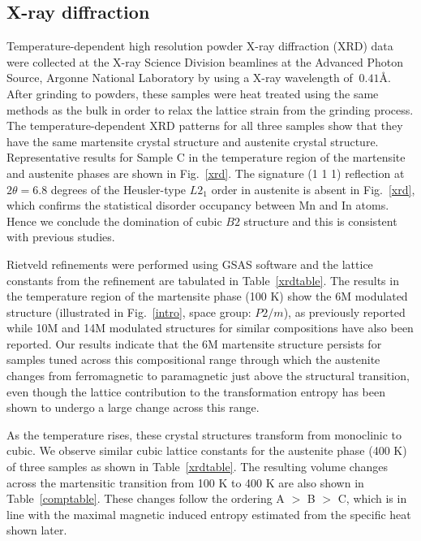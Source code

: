 \documentclass[sort&compress,twocolumn,3p]{elsarticle}
\begin{document}
\subsection{X-ray diffraction}
Temperature-dependent high resolution powder X-ray diffraction (XRD) data were collected at the X-ray Science Division beamlines at the Advanced Photon Source, Argonne National Laboratory by using a X-ray wavelength of $~0.41$\AA.
After grinding to powders, these samples were heat treated using the same methods as the bulk in order to relax the lattice strain from the grinding process.
The temperature-dependent XRD patterns for all three samples show that they have the same martensite crystal structure and austenite crystal structure.
Representative results for Sample C in the temperature region of the martensite and austenite phases are shown in Fig.~\ref{xrd}.
The signature (1 1 1) reflection at $2\theta=6.8$ degrees of the Heusler-type $L2_1$ order in austenite is absent in Fig.~\ref{xrd},
	which confirms the statistical disorder occupancy between Mn and In atoms.
Hence we conclude the domination of cubic $B2$ structure and this is consistent with previous studies\cite{Recarte20121937,Bruno2017}.

Rietveld refinements were performed using GSAS software\cite{larson94,toby01} and the lattice constants from the refinement are tabulated in Table~\ref{xrdtable}.
The results in the temperature region of the martensite phase (100 K) show the 6M modulated structure (illustrated in Fig.~\ref{intro}, space group: $P2/m$),
	as previously reported\cite{Yan2015375,KenichiAbematsu2014M2013372,ADFM:ADFM200801322,doi:10.1063/1.3043456} while 10M and 14M modulated structures for similar compositions have also been reported\cite{PhysRevB.73.174413,doi:10.1063/1.2827179,0953-8984-21-23-233201}.
Our results indicate that the 6M martensite structure persists for samples tuned across this compositional range through which the austenite changes from ferromagnetic to paramagnetic just above the structural transition,
	even though the lattice contribution to the transformation entropy has been shown to undergo a large change across this range\cite{Chen2016176,PhysRevB.92.140406}.

As the temperature rises, these crystal structures transform from monoclinic to cubic.
We observe similar cubic lattice constants for the austenite phase (400 K) of three samples as shown in Table~\ref{xrdtable}.
The resulting volume changes across the martensitic transition from 100 K to 400 K are also shown in Table~\ref{comptable}.
These changes follow the ordering A $>$ B $>$ C, which is in line with the maximal magnetic induced entropy estimated from the specific heat shown later.
\end{document}
